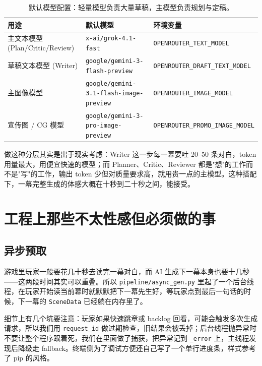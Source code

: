 \documentclass[12pt,a4paper]{article}
\newcommand{\brk}{\discretionary{}{}{}}
\begin{document}
\begin{table}[H]
\centering
\renewcommand{\arraystretch}{1.3}
\small
\begin{tabular}{@{}p{3.8cm} p{5.8cm} p{4.8cm}@{}}
\toprule
\textbf{用途} & \textbf{默认模型} & \textbf{环境变量}\\
\midrule
主文本模型\newline (Plan/\brk Critic/\brk Review) &
\texttt{x-ai/\brk grok-4.1-fast} &
\texttt{OPENROUTER\_\brk TEXT\_MODEL}\\
草稿文本模型 (Writer) &
\texttt{google/\brk gemini-3-\brk flash-preview} &
\texttt{OPENROUTER\_\brk DRAFT\_\brk TEXT\_MODEL}\\
主图像模型 &
\texttt{google/\brk gemini-3.1-\brk flash-\brk image-preview} &
\texttt{OPENROUTER\_\brk IMAGE\_MODEL}\\
宣传图 / CG 模型 &
\texttt{google/\brk gemini-3-\brk pro-image-preview} &
\texttt{OPENROUTER\_\brk PROMO\_\brk IMAGE\_MODEL}\\
\bottomrule
\end{tabular}
\caption{默认模型配置：轻量模型负责大量草稿，主模型负责规划与定稿。}
\end{table}

做这种分层其实是出于现实考虑：Writer 这一步每一幕要吐 20--50 条对白，token 用量最大，用便宜快速的模型；而 Planner、Critic、Reviewer 都是"想"的工作而不是"写"的工作，输出 token 少但对质量要求高，就用贵一点的主模型。这种搭配下，一幕完整生成的体感大概在十秒到二十秒之间，能接受。

\section{工程上那些不太性感但必须做的事}
\label{sec:engineering}

\subsection{异步预取}
游戏里玩家一般要花几十秒去读完一幕对白，而 AI 生成下一幕本身也要十几秒——这两段时间其实可以重叠。所以 \texttt{pipeline/async\_gen.py} 里起了一个后台线程，在玩家开始读当前幕时就默默把下一幕先生好，等玩家点到最后一句话的时候，下一幕的 \texttt{SceneData} 已经躺在内存里了。

细节上有几个坑要注意：玩家如果快速跳章或 backlog 回看，可能会触发多次生成请求，所以我们用 \texttt{request\_id} 做过期检查，旧结果会被丢掉；后台线程抛异常时不要让整个程序跟着死，我们在里面做了捕获，把异常记到 \texttt{\_error} 上，主线程发现后降级走 fallback。终端侧为了调试方便还自己写了一个单行进度条，样式参考了 pip 的风格。
\end{document}
